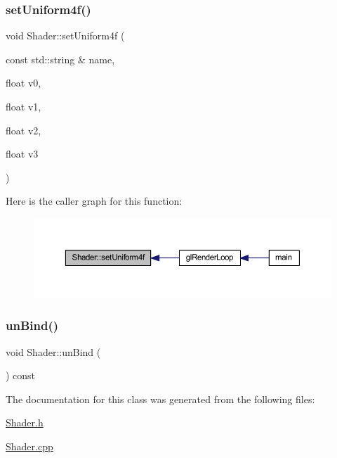 \subsubsection{\texorpdfstring{set\+Uniform4f()}{setUniform4f()}}
{\footnotesize\ttfamily void Shader\+::set\+Uniform4f (\begin{DoxyParamCaption}\item[{const std\+::string \&}]{name,  }\item[{float}]{v0,  }\item[{float}]{v1,  }\item[{float}]{v2,  }\item[{float}]{v3 }\end{DoxyParamCaption})}

Here is the caller graph for this function\+:
\nopagebreak
\begin{figure}[H]
\begin{center}
\leavevmode
\includegraphics[width=350pt]{class_shader_a4580a5874d65651a6632d497f9675934_icgraph}
\end{center}
\end{figure}
\mbox{\label{class_shader_a37c4daec03eb3273ba220ab6cddb4c76}} 
\subsubsection{\texorpdfstring{un\+Bind()}{unBind()}}
{\footnotesize\ttfamily void Shader\+::un\+Bind (\begin{DoxyParamCaption}{ }\end{DoxyParamCaption}) const}



The documentation for this class was generated from the following files\+:\begin{DoxyCompactItemize}
\item 
\mbox{\hyperlink{_shader_8h}{Shader.\+h}}\item 
\mbox{\hyperlink{_shader_8cpp}{Shader.\+cpp}}\end{DoxyCompactItemize}
